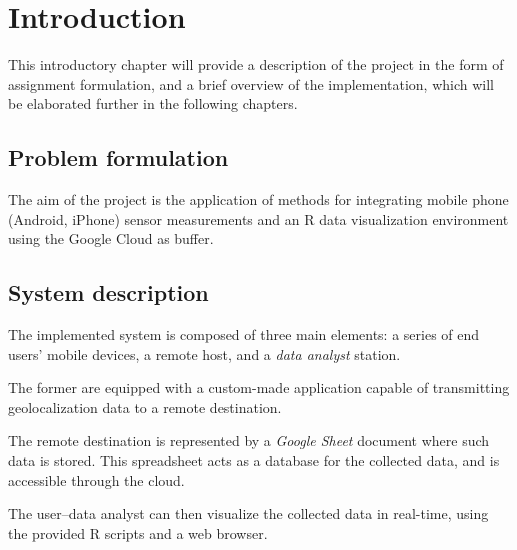 \chapter{Introduction}
This introductory chapter will provide a description of the project in the form of assignment formulation, and a brief overview of the implementation, which will be elaborated further in the following chapters.

\section{Problem formulation}
The aim of the project is the application of methods for integrating mobile phone (Android, iPhone) sensor measurements and an R data visualization environment using the Google Cloud as buffer.

\section{System description}
The implemented system is composed of three main elements: a series of end users' mobile devices, a remote host, and a \emph{data analyst} station.

The former are equipped with a custom-made application capable of transmitting geolocalization data to a remote destination.

The remote destination is represented by a \emph{Google Sheet} document where such data is stored.
This spreadsheet acts as a database for the collected data, and is accessible through the cloud.

The user--data analyst can then visualize the collected data in real-time, using the provided R scripts and a web browser.

